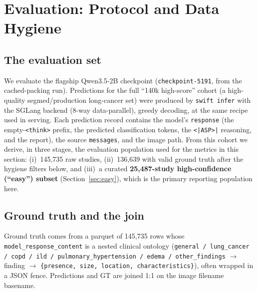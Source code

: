 \documentclass[11pt,a4paper]{article}
\begin{document}
\section{Evaluation: Protocol and Data Hygiene}
\label{sec:eval-protocol}

\subsection{The evaluation set}
We evaluate the flagship Qwen3.5-2B checkpoint (\texttt{checkpoint-5191}, from the cached-packing run). Predictions for the full ``140k high-score'' cohort (a high-quality segmed/production long-cancer set) were produced by \texttt{swift infer} with the SGLang backend (8-way data-parallel), greedy decoding, at the same recipe used in serving. Each prediction record contains the model's \texttt{response} (the empty-\texttt{<think>} prefix, the predicted classification tokens, the \texttt{<|ASP>|} reasoning, and the report), the source \texttt{messages}, and the image path. From this cohort we derive, in three stages, the evaluation population used for the metrics in this section: (i)~145{,}735 raw studies, (ii)~136{,}639 with valid ground truth after the hygiene filters below, and (iii)~a curated \textbf{25{,}487-study high-confidence (``easy'') subset} (Section~\ref{sec:easy}), which is the primary reporting population here.

\subsection{Ground truth and the join}
Ground truth comes from a parquet of 145{,}735 rows whose \texttt{model\_response\_content} is a nested clinical ontology (\texttt{general / lung\_cancer / copd / ild / pulmonary\_hypertension / edema / other\_findings} $\rightarrow$ finding $\rightarrow$ \texttt{\{presence, size, location, characteristics\}}), often wrapped in a JSON fence. Predictions and GT are joined 1:1 on the image filename basename.
\end{document}
